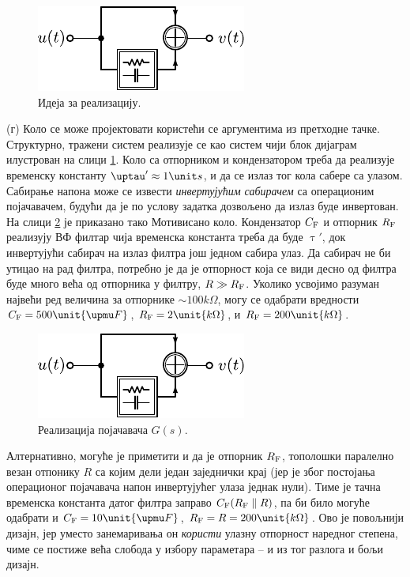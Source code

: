 \begin{figure}
    \includegraphics[page=1]{fig/mot_kolo.pdf}  
    \caption{Идеја за реализацију.}  
    \label{fig:\ID.blok}
\end{figure}
(г)
Коло се може пројектовати користећи се аргументима из претходне тачке. Структурно, тражени систем 
реализује се као систем чији блок дијаграм илустрован на слици \ref{fig:\ID.blok}. 
Коло са отпорником и кондензатором треба да реализује временску константу 
$\uptau' \approx 1\unit s$, и да се излаз тог кола сабере са улазом. Сабирање напона може 
се извести \textit{инвертујућим сабирачем} са операционим појачавачем, будући да је по услову
задатка дозвољено да излаз буде инвертован. На слици \ref{fig:\ID.kolo} је приказано тако Мотивисано
коло. Кондензатор $C_{\rm F}$ и отпорник $R_{\rm F}$ реализују ВФ филтар чија временска константа 
треба да буде $\uptau'$, док инвертујући сабирач на излаз филтра још једном сабира улаз. Да сабирач 
не би утицао на рад филтра, потребно је да је отпорност која се види десно од филтра буде много 
већа од отпорника у филтру, $R \gg R_{\rm F}$. Уколико усвојимо разуман највећи ред величина 
за отпорнике $\sim 100\unit{k\Omega}$, могу се одабрати вредности 
$C_{\rm F} = 500\unit{\upmu F}$, $R_{\rm F} = 2\unit{k\Omega}$, и 
$R_{\rm F} = 200\unit{k\Omega}$. 

\begin{figure}[ht!]
    \centering 
    \includegraphics[page=2]{fig/mot_kolo.pdf}        
    \caption{Реализација појачавача $G(s)$.}
    \label{fig:\ID.kolo}
\end{figure}

Алтернативно, могуће је приметити и да је отпорник $R_{\rm F}$, тополошки паралелно везан отпонику 
$R$ са којим дели један заједнички крај (јер је због постојања операционог појачавача напон инвертујућег
улаза једнак нули). 
Тиме је тачна временска константа датог филтра заправо $C_{\rm F} (R_{\rm F} \parallel R)$, па би било
могуће одабрати и $C_{\rm F} = 10\unit{\upmu F}$, $R_{\rm F} = R = 200\unit{k\Omega}$.  Ово је повољнији 
дизајн, јер уместо занемаривања он \textit{користи} улазну отпорност наредног степена, чиме се постиже 
већа слобода у избору параметара -- и из тог разлога и бољи дизајн.
